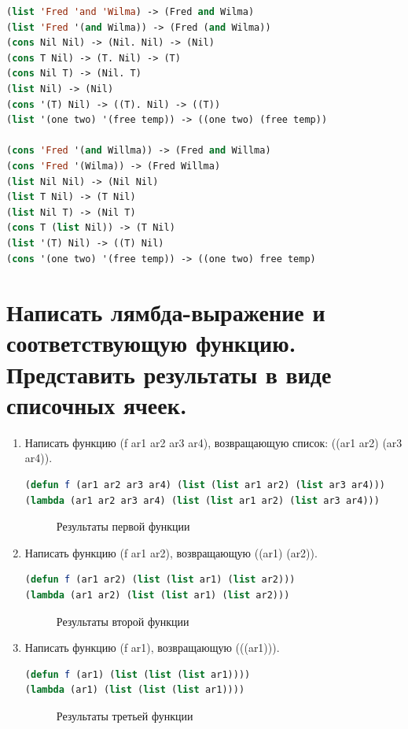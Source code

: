 \documentclass[12pt]{report}
\newcommand{\img}[3] {
    \begin{figure}[h]
        \center{\texttt{[image: img/\#2]}}
        \caption{#3}
        \label{img:#2}
    \end{figure}
}
\begin{document}
\begin{lstlisting}[language=Lisp]
(list 'Fred 'and 'Wilma) -> (Fred and Wilma)
(list 'Fred '(and Wilma)) -> (Fred (and Wilma))
(cons Nil Nil) -> (Nil. Nil) -> (Nil)
(cons T Nil) -> (T. Nil) -> (T)
(cons Nil T) -> (Nil. T)
(list Nil) -> (Nil)
(cons '(T) Nil)	-> ((T). Nil) -> ((T))
(list '(one two) '(free temp)) -> ((one two) (free temp))
	
(cons 'Fred '(and Willma)) -> (Fred and Willma)
(cons 'Fred '(Wilma)) -> (Fred Willma)
(list Nil Nil) -> (Nil Nil)
(list T Nil) -> (T Nil)
(list Nil T) -> (Nil T)
(cons T (list Nil)) -> (T Nil)
(list '(T) Nil) -> ((T) Nil)
(cons '(one two) '(free temp)) -> ((one two) free temp)
\end{lstlisting}

\section{Написать лямбда-выражение и соответствующую функцию. Представить результаты в виде списочных ячеек.}

\begin{enumerate}
    \item Написать функцию (f ar1 ar2 ar3 ar4), возвращающую список: ((ar1 ar2) (ar3 ar4)).
\begin{lstlisting}[language=Lisp] 
(defun f (ar1 ar2 ar3 ar4) (list (list ar1 ar2) (list ar3 ar4)))
(lambda (ar1 ar2 ar3 ar4) (list (list ar1 ar2) (list ar3 ar4)))
\end{lstlisting}

\img{32mm}{1}{Результаты первой функции}

    \item Написать функцию (f ar1 ar2), возвращающую ((ar1) (ar2)).
\begin{lstlisting}[language=Lisp]
(defun f (ar1 ar2) (list (list ar1) (list ar2)))
(lambda (ar1 ar2) (list (list ar1) (list ar2)))
\end{lstlisting}

\img{35mm}{2}{Результаты второй функции}

    \item Написать функцию (f ar1), возвращающую (((ar1))).
\begin{lstlisting}[language=Lisp]
(defun f (ar1) (list (list (list ar1))))
(lambda (ar1) (list (list (list ar1))))
\end{lstlisting}

\img{42mm}{3}{Результаты третьей функции}
\end{enumerate}


	
\end{document}
